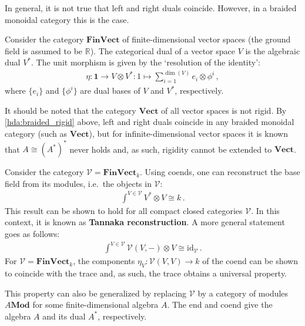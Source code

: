     \begin{property}\label{hda:braided_rigid}
        In general, it is not true that left and right duals coincide. However, in a braided monoidal category this is the case.
    \end{property}

    \begin{example}[FinVect]
        Consider the category $\mathbf{FinVect}$ of finite-dimensional vector spaces (the ground field is assumed to be $\mathbb{R}$). The categorical dual of a vector space $V$ is the algebraic dual $V^*$. The unit morphism is given by the `resolution of the identity':
        \begin{gather}
            \eta:\mathbf{1}\rightarrow V\otimes V^*:1\mapsto\sum_{i=1}^{\dim(V)}e_i\otimes\phi^i\,,
        \end{gather}
        where $\{e_i\}$ and $\{\phi^i\}$ are dual bases of $V$ and $V^*$, respectively.

        It should be noted that the category $\mathbf{Vect}$ of all vector spaces is not rigid. By \cref{hda:braided_rigid} above, left and right duals coincide in any braided monoidal category (such as $\mathbf{Vect}$), but for infinite-dimensional vector spaces it is known that $A\cong(A^*)^*$ never holds and, as such, rigidity cannot be extended to $\mathbf{Vect}$.
    \end{example}

    \begin{property}
        Consider the category $\mathcal{V}=\mathbf{FinVect}_k$. Using coends, one can reconstruct the base field from its modules, i.e.~the objects in $\mathcal{V}$:
        \begin{gather}
            \int^{V\in\mathcal{V}}V^*\otimes V\cong k\,.
        \end{gather}
        This result can be shown to hold for all compact closed categories $\mathcal{V}$. In this context, it is known as \textbf{Tannaka reconstruction}. A more general statement goes as follows:
        \begin{gather}
            \int^{V\in\mathcal{V}}\mathcal{V}(V,-)\otimes V\cong\mathrm{id}_{\mathcal{V}}\,.
        \end{gather}
        For $\mathcal{V}=\mathbf{FinVect}_k$, the components $\eta_V:\mathcal{V}(V,V)\rightarrow k$ of the coend can be shown to coincide with the trace and, as such, the trace obtains a universal property.
    \end{property}
    \begin{remark}
        This property can also be generalized by replacing $\mathcal{V}$ by a category of modules $A\mathbf{Mod}$ for some finite-dimensional algebra $A$. The end and coend give the algebra $A$ and its dual $A^*$, respectively.
    \end{remark}

